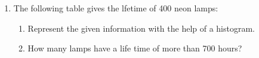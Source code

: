 \renewcommand{\theequation}{\theenumi}
\begin{enumerate}[label=\thesection.\arabic*.,ref=\thesection.\theenumi]
\item The following table gives the lfetime of 400 neon lamps:
\begin{table}[ht!]
\centering

\label{table:Q41}	
\end{table}
\begin{enumerate}
\item Represent the given information with the
help of a histogram.
\item How many lamps have a life time of more
than 700 hours?
\end{enumerate}
\end{enumerate}